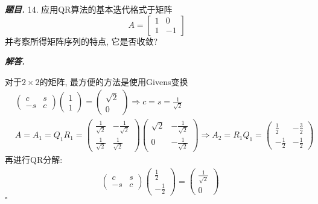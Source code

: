 \documentclass[10pt, a4paper, oneside]{ctexart}
\newenvironment{problem}{\begin{framed}\par\noindent\textbf{\textit{题目. }}}{\end{framed}\par}
\newenvironment{solution}{%
  \par\noindent\textbf{\textit{解答. }}\ignorespaces
}{%
  \hfill\ensuremath{\square}\par %
}
\begin{document}
    \begin{problem}
    14. 应用QR算法的基本迭代格式于矩阵
    $$A=\begin{bmatrix}
        1&0\\1&-1
    \end{bmatrix}$$ 
    并考察所得矩阵序列的特点, 它是否收敛?  
    \end{problem}
    \begin{solution}
    对于$2\times 2$的矩阵, 最方便的方法是使用Givens变换
    \begin{align*}
        &\begin{pmatrix}
            c&s\\
            -s&c
        \end{pmatrix}\begin{pmatrix}
            1\\1
        \end{pmatrix}=\begin{pmatrix}
            \sqrt{2}\\0
        \end{pmatrix}\Rightarrow c=s=\frac{1}{\sqrt{2}}\\
        &A=A_1=Q_1R_1=\begin{pmatrix}
            \frac{1}{\sqrt{2}}&-\frac{1}{\sqrt{2}}\\
            \frac{1}{\sqrt{2}}&\frac{1}{\sqrt{2}}
        \end{pmatrix}\begin{pmatrix}
            \sqrt{2}&-\frac{1}{\sqrt{2}}\\
            0&-\frac{1}{\sqrt{2}}
        \end{pmatrix}\Rightarrow A_2=R_1Q_1=\begin{pmatrix}
            \frac{1}{2}&-\frac{3}{2}\\
            -\frac{1}{2}&-\frac{1}{2}
        \end{pmatrix}
    \end{align*}
    再进行QR分解:
    \begin{align*}
        &\begin{pmatrix}
            c&s\\
            -s&c
        \end{pmatrix}\begin{pmatrix}
            \frac{1}{2}\\-\frac{1}{2}
        \end{pmatrix}=\begin{pmatrix}
            \frac{1}{\sqrt{2}}\\0

\end{pmatrix}
\end{align*}
\end{solution}
\end{document}
